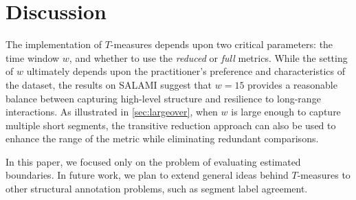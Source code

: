 \documentclass{article}
\begin{document}


\section{Discussion}\label{sec:conclusions}

The implementation of $T$-measures depends upon two critical parameters: the time window
$w$, and whether to use the \emph{reduced} or \emph{full} metrics.  While the setting of
$w$ ultimately depends upon the practitioner's preference and characteristics of the
dataset, the results on SALAMI suggest that $w=15$ provides a reasonable balance
between capturing high-level structure and resilience to long-range interactions.
As illustrated in \cref{sec:largeover}, when $w$ is large enough to capture multiple short
segments, the transitive reduction approach can also be used to enhance the range
of the metric while eliminating redundant comparisons.

In this paper, we focused only on the problem of evaluating estimated boundaries.
In future work, we plan to extend general ideas behind $T$-measures to other structural 
annotation problems, such as segment label agreement.


\end{document}
